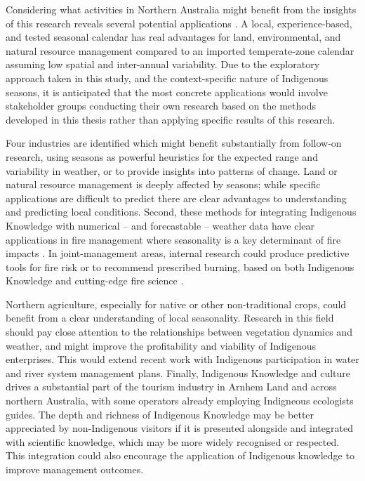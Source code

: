 Considering what activities in Northern Australia might benefit from the
insights of this research reveals several potential applications
\citep[see eg.][]{whitepaper}.  A local, experience-based, and tested seasonal calendar has real
advantages for land, environmental, and natural resource management compared
to an imported temperate-zone calendar assuming low spatial and inter-annual variability.
%
Due to the exploratory approach taken in this study, and the context-specific
nature of Indigenous seasons, it is anticipated that the most concrete applications
would involve stakeholder groups conducting their own research based on the
methods developed in this thesis rather than applying specific results of this research.


Four industries are identified which might benefit substantially from follow-on
research, using seasons as powerful heuristics for the expected range
and variability in weather, or to provide insights into patterns of change.
%
Land or natural resource management is deeply affected by seasons; while
specific applications are difficult to predict there are clear advantages
to understanding and predicting local conditions.
%
Second, these methods for integrating Indigenous Knowledge with numerical --
and forecastable -- weather data have clear applications in fire management
where seasonality is a key determinant of fire impacts \citep{driscoll2010}.
In joint-management areas, internal research could produce predictive tools
for fire risk or to recommend prescribed burning, based on both Indigenous
Knowledge and cutting-edge fire science \citep[see eg.][]{bowman2003,yibarbuk2001}.

Northern agriculture, especially for native or other non-traditional crops,
could benefit from a clear understanding of local seasonality.  Research in
this field should pay close attention to the relationships between vegetation
dynamics and weather, and might improve the profitability and viability of Indigenous
enterprises.  This would extend recent work \citep[eg.][]{jackson2012,jackson2015}
with Indigenous participation in water and river system management plans.
%
Finally, Indigenous Knowledge and culture drives a substantial part of the
tourism industry in Arnhem Land and across northern Australia, with some
operators already employing Indigneous ecologists guides.  The depth and
richness of Indigenous Knowledge may be better appreciated by non-Indigenous visitors if
it is presented alongside and integrated with scientific knowledge, which
may be more widely recognised or respected.  This integration could also
encourage the application of Indigenous knowledge to improve management outcomes.


